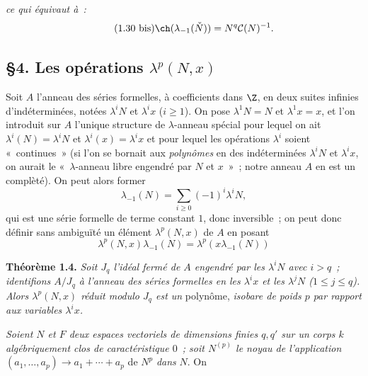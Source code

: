 \emph{ce qui équivaut à~:}
\begin{equation}\tag{1.30 bis}
\ch(\lambda_{-1}(\check N))=N^q\mathcal C(N)^{-1}.
\end{equation}

\subsection*{\S 4. Les opérations $\lambda^p(N,x)$}

Soit $A$ l'anneau des séries formelles, à coefficients dans $\Z$, en deux suites infinies d'indéterminées, notées $\lambda^iN$ et $\lambda^i x$ ($i\geq1$). On pose $\lambda^1N=N$ et $\lambda^1x=x$, et l'on introduit sur $A$ l'unique structure de $\lambda$-anneau spécial pour lequel on ait $\lambda^i(N)=\lambda^iN$ et $\lambda^i(x)=\lambda^ix$ et pour lequel les opérations $\lambda^i$ soient «~continues~» (si l'on se bornait aux \emph{polynômes} en des indéterminées $\lambda^iN$ et $\lambda^ix$, on aurait le «~$\lambda$-anneau libre engendré par $N$ et $x$~»~; notre anneau $A$ en est un complèté). On peut alors former
\begin{equation}\tag{1.31}
\lambda_{-1}(N)=\sum_{i\geq0}(-1)^i\lambda^iN,
\end{equation}
qui est une série formelle de terme constant $1$, donc inversible~; on peut donc définir sans ambiguïté un élément $\lambda^p(N,x)$ de $A$ en posant
\begin{equation}\tag{1.32}
\lambda^p(N,x)\lambda_{-1}(N)=\lambda^p(x\lambda_{-1}(N))
\end{equation}

\textbf{Théorème 1.4.} \emph{Soit $J_q$ l'idéal fermé de $A$ engendré par les $\lambda^iN$ avec $i>q$~; identifions $A/J_q$ à l'anneau des séries formelles en les $\lambda^i x$ et les $\lambda^jN$ ($1\leq j\leq q$). Alors $\lambda^p(N,x)$ réduit modulo $J_q$ est un} polynôme, \emph{isobare de poids $p$ par rapport aux variables $\lambda^i x$.}

\emph{Soient $N$ et $F$ deux espaces vectoriels de dimensions finies $q,q'$ sur un corps $k$ algébriquement clos de caractéristique $0$~; soit $N^{(p)}$ le noyau de l'application} $(a_1,\ldots,a_p)\longrightarrow a_1+\cdots+a_p$ de $N^p$ \emph{dans} $N$.
On 

